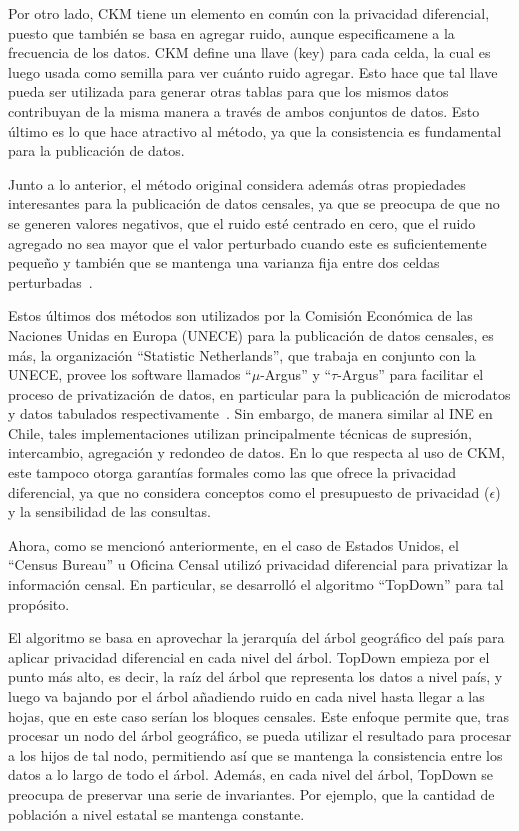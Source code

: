 \documentclass[informe]{upropuesta}
\begin{document}
Por otro lado, CKM tiene un elemento en común con la privacidad diferencial, puesto que también se basa en agregar ruido, aunque especificamene a la frecuencia de los datos. CKM define una llave (key) para cada celda, la cual es luego usada como semilla para ver cuánto ruido agregar. Esto hace que tal llave pueda ser utilizada para generar otras tablas para que los mismos datos contribuyan de la misma manera a través de ambos conjuntos de datos. Esto último es lo que hace atractivo al método, ya que la consistencia es fundamental para la publicación de datos.

Junto a lo anterior, el método original considera además otras propiedades interesantes para la publicación de datos censales, ya que se preocupa de que no se generen valores negativos, que el ruido esté centrado en cero, que el ruido agregado no sea mayor que el valor perturbado cuando este es suficientemente pequeño y también que se mantenga una varianza fija entre dos celdas perturbadas~\cite{ogCKM}. 

Estos últimos dos métodos son utilizados por la Comisión Económica de las Naciones Unidas en Europa (UNECE) para la publicación de datos censales, es más, la organización “Statistic Netherlands”, que trabaja en conjunto con la UNECE, provee los software llamados “$\mu$-Argus” y “$\tau$-Argus” para facilitar el proceso de privatización de datos, en particular para la publicación de microdatos y datos tabulados respectivamente~\cite{cbsARGUS}. Sin embargo, de manera similar al INE en Chile, tales implementaciones utilizan principalmente técnicas de supresión, intercambio, agregación y redondeo de datos. En lo que respecta al uso de CKM, este tampoco otorga garantías formales como las que ofrece la privacidad diferencial, ya que no considera conceptos como el presupuesto de privacidad ($\epsilon$) y la sensibilidad de las consultas.

Ahora, como se mencionó anteriormente, en el caso de Estados Unidos, el “Census Bureau” u Oficina Censal utilizó privacidad diferencial para privatizar la información censal. En particular, se desarrolló el algoritmo “TopDown” para tal propósito. 

El algoritmo se basa en aprovechar la jerarquía del árbol geográfico del país para aplicar privacidad diferencial en cada nivel del árbol. TopDown empieza por el punto más alto, es decir, la raíz del árbol que representa los datos a nivel país, y luego va bajando por el árbol añadiendo ruido en cada nivel hasta llegar a las hojas, que en este caso serían los bloques censales. Este enfoque permite que, tras procesar un nodo del árbol geográfico, se pueda utilizar el resultado para procesar a los hijos de tal nodo, permitiendo así que se mantenga la consistencia entre los datos a lo largo de todo el árbol. Además, en cada nivel del árbol, TopDown se preocupa de preservar una serie de invariantes. Por ejemplo, que la cantidad de población a nivel estatal se mantenga constante. 
\end{document}

